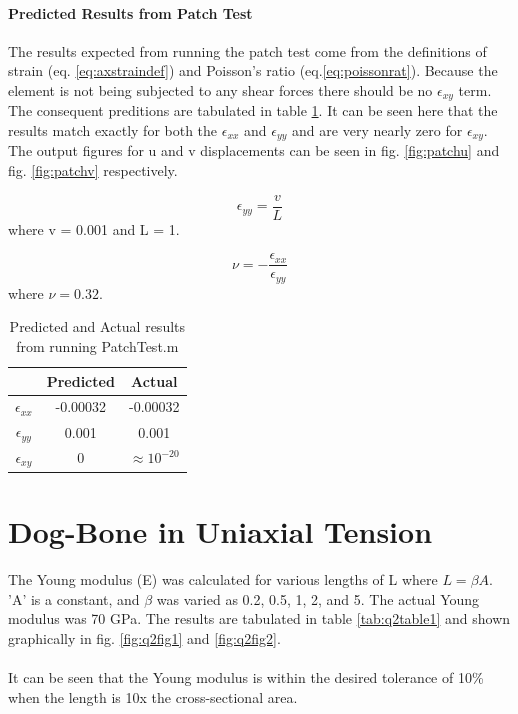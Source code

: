 \documentclass[paper=letter, fontsize=11pt]{scrartcl} %
\numberwithin{equation}{section} %
\numberwithin{figure}{section} %
\numberwithin{table}{section} %
\begin{document}
\paragraph{Predicted Results from Patch Test}
The results expected from running the patch test come from the definitions of strain (eq. \ref{eq:axstraindef}) and Poisson's ratio (eq.\ref{eq:poissonrat}). Because the element is not being subjected to any shear forces there should be no $\epsilon_{xy}$ term. The consequent preditions are tabulated in table \ref{tab:patchtab}. It can be seen here that the results match exactly for both the $\epsilon_{xx}$ and $\epsilon_{yy}$ and are very nearly zero for $\epsilon_{xy}$. The output figures for u and v displacements can be seen in fig. \ref{fig:patchu} and fig. \ref{fig:patchv} respectively.

\begin{equation} \label{eq:axstraindef}
\epsilon_{yy} = \frac{v}{L}
\end{equation}
where v = 0.001 and L = 1. 

\begin{equation} \label{eq:poissonrat}
\nu = - \frac{\epsilon_{xx}}{\epsilon_{yy}}
\end{equation}
where $\nu = 0.32$.

\begin{table}[h]
\centering
	\begin{tabular}{c c c}
		& Predicted & Actual \\
		\hline
		$\epsilon_{xx}$ & -0.00032 & -0.00032 \\
		$\epsilon_{yy}$ & 0.001 & 0.001 \\
		$\epsilon_{xy}$ & 0 & $\approx 10^{-20}$ \\
		\hline
	\end{tabular}
\caption{Predicted and Actual results from running PatchTest.m}
\label{tab:patchtab}
\end{table}
	

\pagebreak
\section{Dog-Bone in Uniaxial Tension}


The Young modulus (E) was calculated for various lengths of L where $L = \beta A$. 'A' is a constant, and $\beta$ was varied as 0.2, 0.5, 1, 2, and 5. The actual Young modulus was 70 GPa. The results are tabulated in table \ref{tab:q2table1} and shown graphically in fig. \ref{fig:q2fig1} and \ref{fig:q2fig2}. \\
\\
It can be seen that the Young modulus is within the desired tolerance of 10\% when the length is 10x the cross-sectional area. \\
\\
\end{document}

